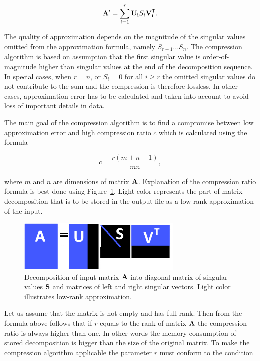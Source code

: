 \begin{equation}
\mathbf{A'}=\sum_{i=1}^{r} \mathbf{U_{i}}S_{i}\mathbf{V_{i}^{\mathsf{T}}}.
\label{eq:svd-approx-expansion}
\end{equation}

The quality of approximation depends on the magnitude of the singular values omitted from the approximation formula, namely $S_{r+1} ...  S_{n}$. The compression algorithm is based on assumption that the first singular value is order-of-magnitude higher than singular values at the end of the decomposition sequence. In special cases, when $r=n$, or $S_{i}=0$ for all $i \geq r$ the omitted singular values do not contribute to the sum and the compression is therefore lossless. In other cases, approximation error has to be calculated and taken into account to avoid loss of important details in data.

The main goal of the compression algorithm is to find a compromise between low approximation error and high compression ratio $c$ which is calculated using the formula

\begin{equation}
c=\frac{r(m+n+1)}{m n},
\label{eq:cr-def}
\end{equation}

\noindent
where $m$ and $n$ are dimensions of matrix $\mathbf{A}$. Explanation of the compression ratio formula is best done using Figure~\ref{fig:lowrank_svd}. Light color represents the part of matrix decomposition that is to be stored in the output file as a low-rank approximation of the input.

\begin{figure}[H]
\centering\includegraphics[width=0.7\textwidth]{figures/low_rank_decomposition_diagram}
\caption{Decomposition of input matrix $\mathbf{A}$ into diagonal matrix of singular values $\mathbf{S}$ and matrices of left and right singular vectors. Light color illustrates low-rank approximation.}
\label{fig:lowrank_svd}
\end{figure}

Let us assume that the matrix is not empty and has full-rank. Then from the formula above follows that if $r$ equals to the rank of matrix $\mathbf{A}$ the compression ratio is always higher than one. In other words the memory consumption of stored decomposition is bigger than the size of the original matrix. To make the compression algorithm applicable the parameter $r$ must conform to the condition

